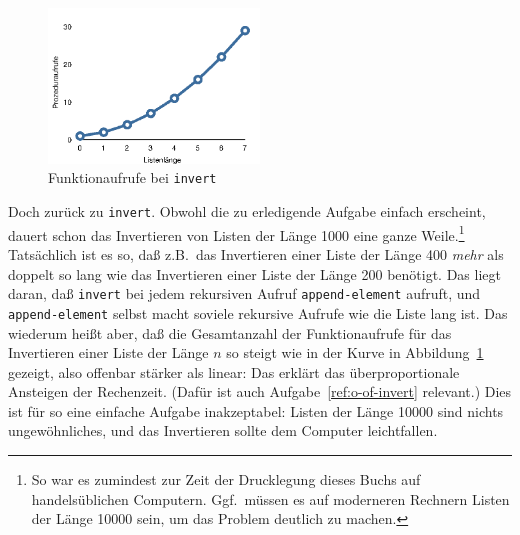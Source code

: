 %
\begin{figure}[tb]
  \centering
  \includegraphics[width=0.5\textwidth]{invert-calls}
  \caption{Funktionaufrufe bei \texttt{invert}}
  \label{fig:invert-calls}
\end{figure}
%
Doch zurück zu \texttt{invert}.  Obwohl die zu erledigende Aufgabe
einfach erscheint, dauert schon das Invertieren von Listen der Länge
1000 eine ganze Weile.\footnote{So war es zumindest zur Zeit der
  Drucklegung dieses Buchs auf handelsüblichen Computern.  Ggf.\
  müssen es auf moderneren Rechnern Listen der Länge 10000 sein, um
  das Problem deutlich zu machen.}  
Tatsächlich ist es so, daß z.B.\
das Invertieren einer Liste der Länge 400 \emph{mehr} als doppelt so
lang wie das Invertieren einer Liste der Länge 200 benötigt.  Das
liegt daran, daß \texttt{invert} bei jedem rekursiven Aufruf
\texttt{append-element} aufruft, und \texttt{append-element} selbst
macht soviele rekursive Aufrufe wie die Liste lang ist.  Das wiederum
heißt aber, daß die Gesamtanzahl der Funktionaufrufe für das
Invertieren einer Liste der Länge $n$ so steigt wie in
der Kurve in Abbildung~\ref{fig:invert-calls} gezeigt, also offenbar
stärker als linear: Das erklärt das überproportionale Ansteigen der
Rechenzeit.  (Dafür ist auch Aufgabe~\ref{ref:o-of-invert} relevant.)
Dies ist für so eine einfache Aufgabe
inakzeptabel: Listen der Länge 10000 sind nichts ungewöhnliches, und
das Invertieren sollte dem Computer leichtfallen.

